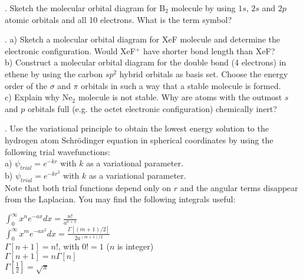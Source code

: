 
. Sketch the molecular orbital diagram for B$_2$ molecule by using $1s$, $2s$ and $2p$ atomic orbitals and
all 10 electrons. What is the term symbol?\\


. a) Sketch a molecular orbital diagram for XeF molecule and determine the electronic configuration. Would
XeF$^+$ have shorter bond length than XeF?\\
\phantom{5. }b) Construct a molecular orbital diagram for the double bond (4 electrons) in ethene by using
the carbon $sp^2$ hybrid orbitals as basis set. Choose the energy order of the $\sigma$ and $\pi$ orbitals
in such a way that a stable molecule is formed.\\
\phantom{5. }c) Explain why Ne$_2$ molecule is not stable. Why are atoms with the outmost $s$ and $p$ orbitals 
full (e.g. the octet electronic configuration) chemically inert?\\


. Use the variational principle to obtain the lowest energy solution to the hydrogen atom Schr\"odinger
equation in spherical coordinates by using the following trial wavefunctions:\\
\phantom{6. }a) $\psi_{trial} = e^{-kr}$ with $k$ as a variational parameter.\\
\phantom{6. }b) $\psi_{trial} = e^{-kr^2}$ with $k$ as a variational parameter.\\
Note that both trial functions depend only on $r$ and the angular terms disappear
from the Laplacian. You may find the following integrals useful:

\begin{center}
$\int_0^\infty x^ne^{-ax}dx = \frac{n!}{a^{n+1}}$\\
$\int_0^\infty x^me^{-ax^2}dx = \frac{\Gamma[(m + 1)/2]}{2a^{(m + 1) / 2}}$\\
$\Gamma[n + 1] = n!$, with $0! = 1$ ($n$ is integer)\\
$\Gamma[n + 1] = n\Gamma[n]$\\
$\Gamma\left[\frac{1}{2}\right] = \sqrt{\pi}$
\end{center}


